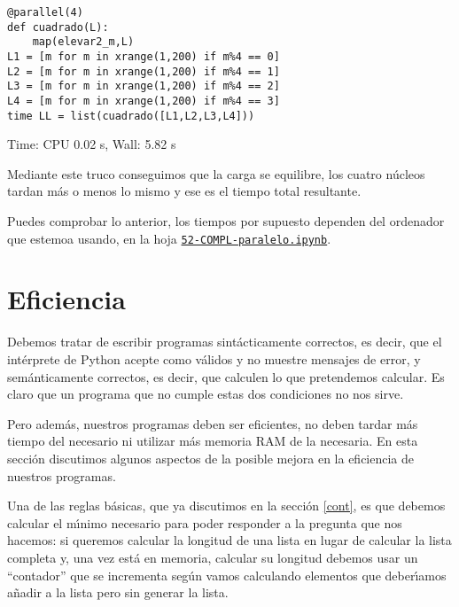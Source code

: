 \begin{lstlisting}
@parallel(4)
def cuadrado(L):
	map(elevar2_m,L)
L1 = [m for m in xrange(1,200) if m%4 == 0]
L2 = [m for m in xrange(1,200) if m%4 == 1]
L3 = [m for m in xrange(1,200) if m%4 == 2]
L4 = [m for m in xrange(1,200) if m%4 == 3]
time LL = list(cuadrado([L1,L2,L3,L4]))
\end{lstlisting}
\begin{Output}
	Time: CPU 0.02 s, Wall: 5.82 s
\end{Output}

Mediante este truco conseguimos que la carga se equilibre, los cuatro n\'ucleos
tardan m\'as o menos lo mismo y ese es el tiempo total resultante. 

Puedes comprobar lo anterior, los tiempos por supuesto dependen del ordenador que estemoa usando, en la hoja 
\href{http://localhost:8888/notebooks/PROGR/COMPL/52-COMPL-paralelo.ipynb}{\tt 52-COMPL-paralelo.ipynb}.





\section{Eficiencia}

Debemos tratar de escribir programas {\sc sint\'acticamente correctos}, es
decir, que el int\'erprete de Python acepte como v\'alidos y no muestre mensajes
de error, y {\sc sem\'anticamente correctos}, es decir, que calculen lo que
pretendemos calcular. Es claro que un programa que no cumple estas dos
condiciones no nos sirve.


Pero adem\'as,  nuestros programas deben ser {\sc eficientes}, no deben tardar
m\'as tiempo
del necesario ni utilizar m\'as memoria RAM de la necesaria. En esta secci\'on
discutimos algunos aspectos de la posible mejora en la eficiencia de nuestros
programas.





Una de las  reglas b\'asicas, que ya discutimos en la secci\'on \ref{cont},  es
que {\sc debemos calcular el m\'{\i}nimo
necesario para poder responder}  a la pregunta que nos hacemos: si queremos
calcular la longitud
de una lista en lugar de calcular la lista completa y, una vez est\'a en
memoria, calcular su longitud debemos usar un ``contador'' que se incrementa
seg\'un vamos calculando elementos que deber\'{\i}amos a\~nadir a la lista pero
sin generar la lista. 

